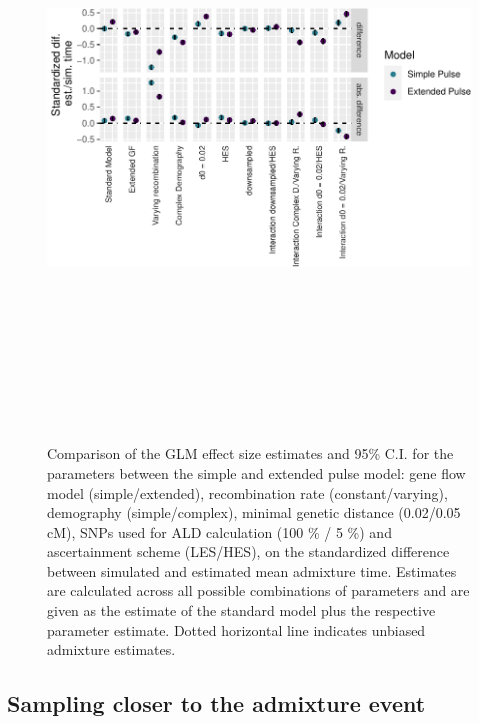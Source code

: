 \documentclass[11pt]{article}
\begin{document}
\begin{figure}
\centering
\includegraphics[width=12cm,height=16cm,keepaspectratio]{ATE_Revisions_files/figure-latex/figResult_3_GLM_SP_and_EP_bias_and_var-1.pdf}
\caption{\label{fig:figGLM} Comparison of the GLM effect size estimates and 95\% C.I. for the parameters between the simple and extended pulse model: gene flow model (simple/extended), recombination rate (constant/varying), demography (simple/complex), minimal genetic distance (0.02/0.05 cM), SNPs used for ALD calculation (100 \% / 5 \%) and ascertainment scheme (LES/HES), on the standardized difference between simulated and estimated mean admixture time. Estimates are calculated across all possible combinations of parameters and are given as the estimate of the standard model plus the respective parameter estimate. Dotted horizontal line indicates unbiased admixture estimates.}
\end{figure}

\subsection{Sampling closer to the admixture event}\label{estimating the Lomax-parameters under different conditions}
\end{document}
